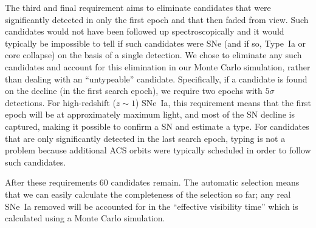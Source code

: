 The third and final requirement aims to eliminate candidates that were
significantly detected in only the first epoch and that then faded
from view. Such candidates would not have been followed up
spectroscopically and it would typically be impossible to tell if such
candidates were SNe (and if so, Type~Ia or core collapse) on the basis
of a single detection. We chose to eliminate any such candidates and
account for this elimination in our Monte Carlo simulation, rather
than dealing with an ``untypeable'' candidate.  Specifically, if a
candidate is found on the decline (in the first search epoch), we
require two epochs with $5\sigma$ detections.  For high-redshift
($z \sim 1$) SNe~Ia, this requirement means that the first epoch will
be at approximately maximum light, and most of the SN decline is
captured, making it possible to confirm a SN and estimate a type.
For candidates that are only significantly detected in the last search
epoch, typing is not a problem because additional ACS orbits were
typically scheduled in order to follow such candidates.

After these requirements 60 candidates remain. The automatic selection
means that we can easily calculate the completeness of the selection
so far; any real SNe~Ia removed will be accounted for in the
``effective visibility time'' which is calculated using a
Monte Carlo simulation.
